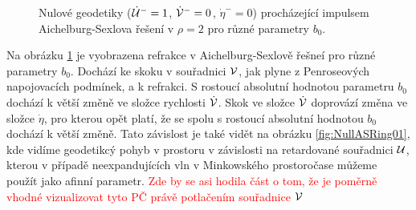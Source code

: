 \begin{figure}[h]
    \centering
     \caption{Nulové geodetiky ($\dot {\mathcal{U}}^-=1$, $\dot {\mathcal{V}}^-=0$, $\dot \eta^-=0$) procházející impulsem
     Aichelburg-Sexlova řešení v $\rho=2$ pro různé parametry $b_0$.}
     \label{fig:Null_UV_AichelburgSexl_parameters}
\end{figure}

Na obrázku \ref{fig:Null_UV_AichelburgSexl_parameters} je vyobrazena refrakce v Aichelburg-Sexlově řešneí pro různé
parametry $b_0$. Dochází ke skoku v souřadnici $\mathcal{V}$, jak plyne z Penroseových napojovacích podmínek, a k refrakci.
S rostoucí absolutní hodnotou parametru $b_0$ dochází k větší změně ve složce rychlosti $\dot {\mathcal{V}}$.
Skok ve složce $\dot {\mathcal{V}}$ doprovází změna ve složce $\dot \eta$, pro kterou opět platí, že se spolu s
rostoucí absolutní hodnotou $b_0$ dochází k větší změně. Tato závislost je také vidět na obrázku \ref{fig:NullASRing01},
kde vidíme geodetikcý pohyb v prostoru v závislosti na retardované souřadnici $\mathcal{U}$, kterou v případě neexpandujících vln
v Minkowského prostoročase můžeme použít jako afinní parametr. \textcolor{red}{Zde by se asi hodila část o tom, že je poměrně vhodné vizualizovat
tyto PČ právě potlačením souřadnice $\mathcal{V}$}


